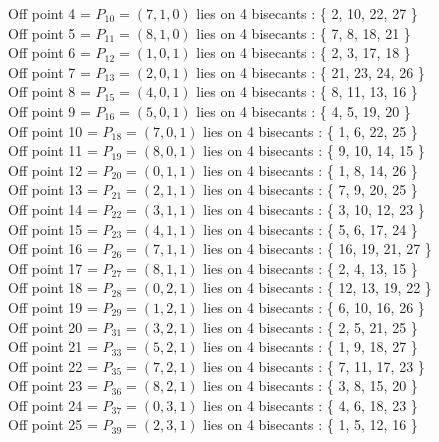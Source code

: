 Off point 4 = $P_{10} = ( 7, 1, 0 )$ lies on 4 bisecants : \{ 2, 10, 22, 27 \}\\
Off point 5 = $P_{11} = ( 8, 1, 0 )$ lies on 4 bisecants : \{ 7, 8, 18, 21 \}\\
Off point 6 = $P_{12} = ( 1, 0, 1 )$ lies on 4 bisecants : \{ 2, 3, 17, 18 \}\\
Off point 7 = $P_{13} = ( 2, 0, 1 )$ lies on 4 bisecants : \{ 21, 23, 24, 26 \}\\
Off point 8 = $P_{15} = ( 4, 0, 1 )$ lies on 4 bisecants : \{ 8, 11, 13, 16 \}\\
Off point 9 = $P_{16} = ( 5, 0, 1 )$ lies on 4 bisecants : \{ 4, 5, 19, 20 \}\\
Off point 10 = $P_{18} = ( 7, 0, 1 )$ lies on 4 bisecants : \{ 1, 6, 22, 25 \}\\
Off point 11 = $P_{19} = ( 8, 0, 1 )$ lies on 4 bisecants : \{ 9, 10, 14, 15 \}\\
Off point 12 = $P_{20} = ( 0, 1, 1 )$ lies on 4 bisecants : \{ 1, 8, 14, 26 \}\\
Off point 13 = $P_{21} = ( 2, 1, 1 )$ lies on 4 bisecants : \{ 7, 9, 20, 25 \}\\
Off point 14 = $P_{22} = ( 3, 1, 1 )$ lies on 4 bisecants : \{ 3, 10, 12, 23 \}\\
Off point 15 = $P_{23} = ( 4, 1, 1 )$ lies on 4 bisecants : \{ 5, 6, 17, 24 \}\\
Off point 16 = $P_{26} = ( 7, 1, 1 )$ lies on 4 bisecants : \{ 16, 19, 21, 27 \}\\
Off point 17 = $P_{27} = ( 8, 1, 1 )$ lies on 4 bisecants : \{ 2, 4, 13, 15 \}\\
Off point 18 = $P_{28} = ( 0, 2, 1 )$ lies on 4 bisecants : \{ 12, 13, 19, 22 \}\\
Off point 19 = $P_{29} = ( 1, 2, 1 )$ lies on 4 bisecants : \{ 6, 10, 16, 26 \}\\
Off point 20 = $P_{31} = ( 3, 2, 1 )$ lies on 4 bisecants : \{ 2, 5, 21, 25 \}\\
Off point 21 = $P_{33} = ( 5, 2, 1 )$ lies on 4 bisecants : \{ 1, 9, 18, 27 \}\\
Off point 22 = $P_{35} = ( 7, 2, 1 )$ lies on 4 bisecants : \{ 7, 11, 17, 23 \}\\
Off point 23 = $P_{36} = ( 8, 2, 1 )$ lies on 4 bisecants : \{ 3, 8, 15, 20 \}\\
Off point 24 = $P_{37} = ( 0, 3, 1 )$ lies on 4 bisecants : \{ 4, 6, 18, 23 \}\\
Off point 25 = $P_{39} = ( 2, 3, 1 )$ lies on 4 bisecants : \{ 1, 5, 12, 16 \}\\
